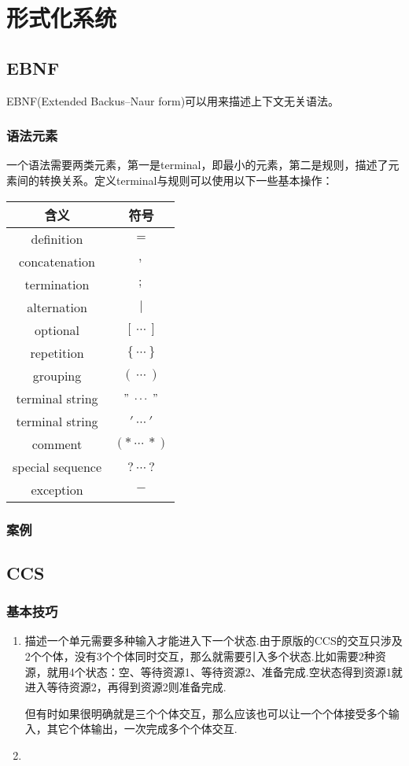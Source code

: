 \chapter{形式化系统}

\section{EBNF}
EBNF(Extended Backus–Naur form)可以用来描述上下文无关语法。
\subsection{语法元素}
一个语法需要两类元素，第一是terminal，即最小的元素，第二是规则，描述了元素间的转换关系。定义terminal与规则可以使用以下一些基本操作：
\begin{longtable}{cc}
	\toprule
	含义&	符号\\
	\midrule
	definition	&$=$\\
	concatenation&	$,$\\
	termination	&$;$\\
	alternation	&$|$\\
	optional	&$[\ \cdots\ ]$\\
	repetition	&$\{\ \cdots\ \}$\\
	grouping &	$(\ \cdots\ )$\\
	terminal string	&$"\ \cdots\ "$\\
	terminal string	&$'\ \cdots\ '$\\
	comment	&$(*\ \cdots\ *)$\\
	special sequence	&$?\ \cdots\ ?$\\
	exception&	$-$\\
	\bottomrule
\end{longtable}

\subsection{案例}

\section{CCS}

\subsection{基本技巧}
\begin{enumerate}
  \item 描述一个单元需要多种输入才能进入下一个状态.由于原版的CCS的交互只涉及2个个体，没有3个个体同时交互，那么就需要引入多个状态.比如需要2种资源，就用4个状态：空、等待资源1、等待资源2、准备完成.空状态得到资源1就进入等待资源2，再得到资源2则准备完成.

      但有时如果很明确就是三个个体交互，那么应该也可以让一个个体接受多个输入，其它个体输出，一次完成多个个体交互.
  \item
\end{enumerate} 

